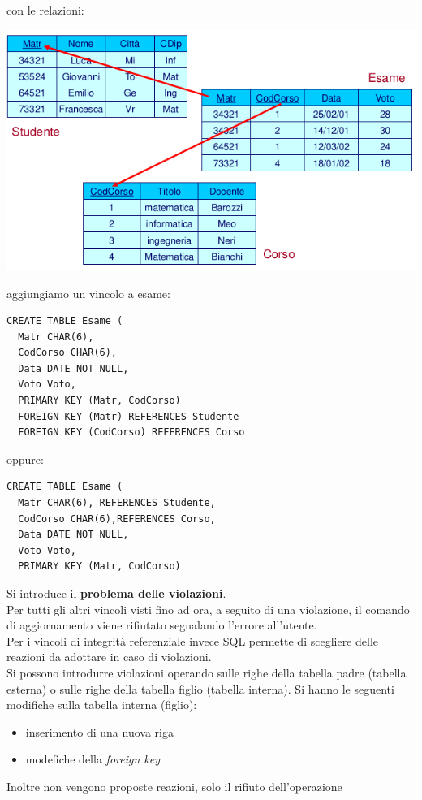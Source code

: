 \documentclass[a4paper,12pt, oneside]{book}
\begin{document}
\begin{esempio}
\begin{center}
\end{center}
con le relazioni:
\begin{center}
\includegraphics[scale=0.7]{img/re.png}
\end{center}
aggiungiamo un vincolo a esame:
\begin{verbatim}
CREATE TABLE Esame (
  Matr CHAR(6),
  CodCorso CHAR(6),
  Data DATE NOT NULL,
  Voto Voto,
  PRIMARY KEY (Matr, CodCorso)
  FOREIGN KEY (Matr) REFERENCES Studente
  FOREIGN KEY (CodCorso) REFERENCES Corso
\end{verbatim}
oppure:
\begin{verbatim}
CREATE TABLE Esame (
  Matr CHAR(6), REFERENCES Studente,
  CodCorso CHAR(6),REFERENCES Corso,
  Data DATE NOT NULL,
  Voto Voto,
  PRIMARY KEY (Matr, CodCorso)
\end{verbatim}
\end{esempio}
Si introduce il \textbf{problema delle violazioni}.\\
Per tutti gli altri vincoli visti fino ad ora, a seguito di
una violazione, il comando di aggiornamento viene
rifiutato segnalando l’errore all’utente.
\\ Per i vincoli di integrità referenziale invece SQL
permette di scegliere delle reazioni da adottare in
caso di violazioni.\\
Si possono introdurre violazioni operando sulle righe della
tabella padre (tabella esterna) o sulle righe della tabella figlio
(tabella interna). Si hanno le seguenti modifiche sulla tabella interna (figlio):
\begin{itemize}
\item inserimento di una nuova riga
\item modefiche della \textit{foreign key}
\end{itemize} 
Inoltre non vengono proposte reazioni, solo il rifiuto dell’operazione\\
\end{document}
